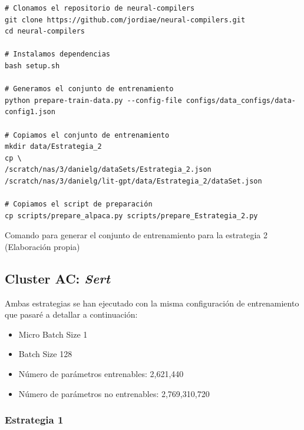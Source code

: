 \begin{mycode}
    \begin{verbatim}
# Clonamos el repositorio de neural-compilers
git clone https://github.com/jordiae/neural-compilers.git
cd neural-compilers

# Instalamos dependencias
bash setup.sh

# Generamos el conjunto de entrenamiento
python prepare-train-data.py --config-file configs/data_configs/data-config1.json

# Copiamos el conjunto de entrenamiento
mkdir data/Estrategia_2
cp \
/scratch/nas/3/danielg/dataSets/Estrategia_2.json 
/scratch/nas/3/danielg/lit-gpt/data/Estrategia_2/dataSet.json

# Copiamos el script de preparación
cp scripts/prepare_alpaca.py scripts/prepare_Estrategia_2.py
    \end{verbatim}
    \caption[Comando para generar el conjunto de entrenamiento para la estrategia 2]{Comando para generar el conjunto de entrenamiento para la estrategia 2 (Elaboración propia)}
    \label{code:DataSet_Estrategia_2}
\end{mycode}

\subsection{Cluster AC: \textit{Sert}}
\label{subsec:cluster_ac_ejecucion}


Ambas estrategias se han ejecutado con la misma configuración de entrenamiento que pasaré
a detallar a continuación:

\begin{itemize}
    \item Micro Batch Size 1
    \item Batch Size 128
    \item Número de parámetros entrenables: 2,621,440
    \item Número de parámetros no entrenables: 2,769,310,720
\end{itemize}

\subsubsection{Estrategia 1}
\label{subsubsec:cluster_ac_ejecucion:estrategia_1}


